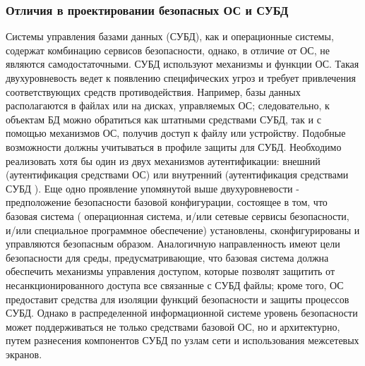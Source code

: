 \subsubsection{Отличия в проектировании безопасных ОС и СУБД}
Системы управления базами данных (СУБД), как и операционные системы, содержат комбинацию сервисов
безопасности, однако, в отличие от ОС, не являются самодостаточными. СУБД используют механизмы
и функции ОС. Такая двухуровневость ведет к появлению специфических угроз и требует привлечения
соответствующих средств противодействия. Например, базы данных располагаются в файлах или на дисках,
управляемых ОС; следовательно, к объектам БД можно обратиться как штатными средствами СУБД, так и с
помощью механизмов ОС, получив доступ к файлу или устройству.
Подобные возможности должны учитываться в профиле защиты для СУБД.
Необходимо реализовать хотя бы один из двух механизмов аутентификации: внешний (аутентификация средствами ОС)
или внутренний (аутентификация средствами СУБД ).
Еще одно проявление упомянутой выше двухуровневости - предположение безопасности базовой конфигурации,
состоящее в том, что базовая система ( операционная система, и/или сетевые сервисы безопасности, и/или
специальное программное обеспечение) установлены, сконфигурированы и управляются безопасным образом.
Аналогичную направленность имеют цели безопасности для среды, предусматривающие, что базовая система
должна обеспечить механизмы управления доступом, которые позволят защитить от несанкционированного доступа
все связанные с СУБД файлы; кроме того, ОС предоставит средства для изоляции функций безопасности и защиты процессов СУБД.
Однако в распределенной информационной системе уровень безопасности может поддерживаться не только средствами базовой ОС,
но и архитектурно, путем разнесения компонентов СУБД по узлам сети и использования межсетевых экранов.

